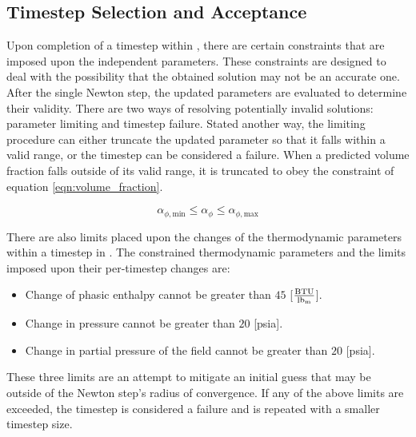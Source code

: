 \subsection{Timestep Selection and Acceptance}
\label{subsect:nlnTimesteps}

Upon completion of a timestep within \cobra{}, there are certain constraints that are imposed upon the independent parameters.
These constraints are designed to deal with the possibility that the obtained solution may not be an accurate one.
After the single Newton step, the updated parameters are evaluated to determine their validity.
There are two ways of resolving potentially invalid solutions: parameter limiting and timestep failure.
Stated another way, the limiting procedure can either truncate the updated parameter so that it falls within a valid range, or the timestep can be considered a failure.
When a predicted volume fraction falls outside of its valid range, it is truncated to obey the constraint of equation \eqref{eqn:volume_fraction}.

\begin{equation}
\label{eqn:volume_fraction}
\alpha_{\phi,\text{min}} \leq \alpha_{\phi} \leq \alpha_{\phi,\text{max}} 
\end{equation}

There are also limits placed upon the changes of the thermodynamic parameters within a timestep in \cobra{}.
The constrained thermodynamic parameters and the limits imposed upon their per-timestep changes are:

\begin{itemize}
\item{Change of phasic enthalpy cannot be greater than $45$ [$\frac{\text{BTU}}{\lbm{}}$].}
\item{Change in pressure cannot be greater than $20$ [psia].}
\item{Change in partial pressure of the \ncg{} field cannot be greater than $20$ [psia].}
\end{itemize}

These three limits are an attempt to mitigate an initial guess that may be outside of the Newton step's radius of convergence.
If any of the above limits are exceeded, the timestep is considered a failure and is repeated with a smaller timestep size.

